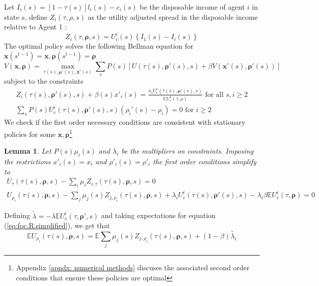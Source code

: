 \documentclass[thmsb,11pt]{article}
\newtheorem{lemma}{Lemma}
\begin{document}
Let $I_i(s)=[1-\tau(s)]l_i(s)-c_i(s)$ be the disposable income of agent $i$ in state $s$, define $Z_i(\tau,\rho,s)$ as the utility adjusted spread in the disposable income relative to Agent 1 :
\[Z_i(\tau,\bm \rho,s)=U^i_c(s)\left\{I_1(s)-I_i(s)\right\}\]
% 
% 
% 
% 
%  
% 
 The optimal policy  solves the following Bellman equation for $\bm{x}(s^{t-1})=\bm{x},\bm{\rho}(s^{t-1})=\bm{\rho}$
% 
 \[
 	V(\bm x,\bm \rho) = \max_{\tau(s),\bm \rho'(s),\bm x'(s)}\sum_s P(s)\left[ U(\tau(s),\bm \rho'(s),s) + \beta V(\bm x'(s),\bm \rho'(s))\right]
 \]subject to the constraints
 \begin{align}
 	Z_i(\tau(s),\bm \rho'(s),s) +\beta(s) x'_i(s) = \frac{x_i U^1_c(\tau(s),\bm \rho'(s),s)}{\mathbb{E} U^1_c(\tau,\rho)}\text{   for all  $s,i \geq 2$}\\
 	\sum_s P(s)U^i_c(\tau(s),\bm \rho'(s),s)(\rho_i'(s)-\rho_i) = 0 \text{  for $i \geq 2$} \label{eq:bondcondtion}
  \end{align}
 We check if the first order necessary conditions are consistent with stationary policies for some $\bm x, \bm \rho$\footnote{Appendix \ref{apndx: numerical methods} discuses the associated second order conditions that ensure these policies are optimal}
 \begin{lemma}\label{lemma-simplified-foc}
Let $P(s)\mu_i(s)$ and $\lambda_i$ be the multipliers on constraints.  Imposing the restrictions $x'_i(s) = x_i$ and $\rho'_i(s) = \rho'_i$ the first order conditions simplify to
\begin{align}
	U_\tau(\tau(s),\bm \rho,s)-\sum_i\mu_i Z_{i,\tau}(\tau(s),\bm \rho,s)  =0  \label{eq:foc.tau.simplified}\\
	U_{\rho_i}(\tau(s),\bm \rho,s) -\sum_j\mu_j(s)Z_{j,\rho_i}(\tau(s),\bm \rho,s)+ \lambda_iU^i_c(\tau(s),\bm \rho'(s),s)-\lambda_i\beta\mathbb{E}U^i_c(\tau,\bm \rho) =0 \label{eq:foc.R.simplified}
\end{align} 
\end{lemma}


Defining $\tilde{\lambda}=-\lambda \mathbb{E} U^i_c(\tau,\bm \rho',s)$ and taking expectations for equation (\ref{eq:foc.R.simplified}), we get that
\begin{equation}
\label{eq.ss.tradeoffs}
\mathbb{E} U_{\rho_i}(\tau(s),\bm \rho,s)= \mathbb{E} \sum_j\mu_j(s)Z_{j,\rho_i}(\tau(s),\bm \rho,s) + (1-\beta)\tilde{\lambda_i} 
\end{equation}
\end{document}
